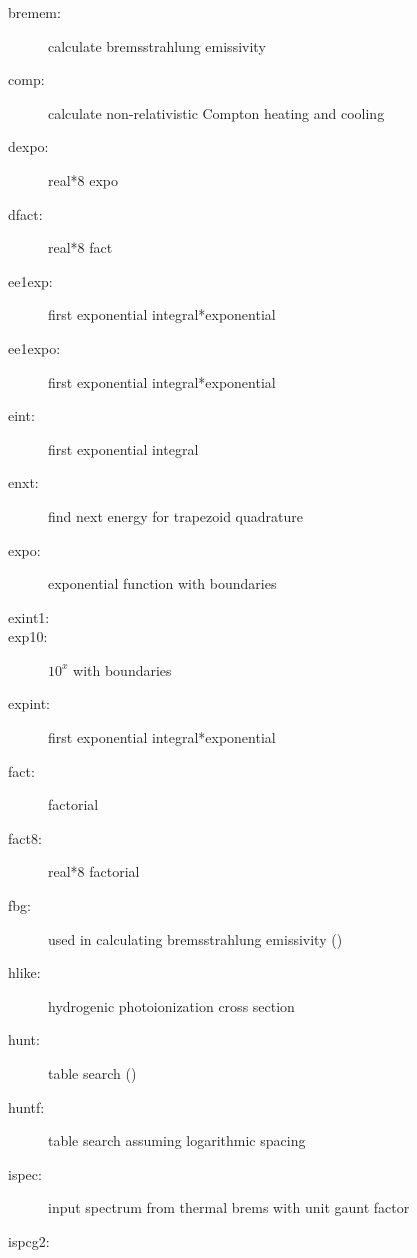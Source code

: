 \begin{description}

\item[bremem:]calculate bremsstrahlung emissivity


\item[comp:]calculate non-relativistic Compton heating and cooling

\item[dexpo:] real*8 expo

\item[dfact:] real*8 fact

\item[ee1exp:]first exponential integral*exponential

\item[ee1expo:]first exponential integral*exponential

\item[eint:]first exponential integral

\item[enxt:] find next energy for trapezoid quadrature

\item[expo:]exponential function with boundaries

\item[exint1:]

\item[exp10:] $10^x$ with boundaries

\item[expint:]first exponential integral*exponential

\item[fact:] factorial

\item[fact8:] real*8 factorial

\item[fbg:]used in calculating bremsstrahlung emissivity (\cite{Raymond1976})

\item[hlike:]hydrogenic photoionization cross section

\item[hunt:]table search (\cite{Press})

\item[huntf:]table search assuming logarithmic spacing

\item[ispec:]input spectrum from thermal brems with unit gaunt factor

\item[ispcg2:]


\end{description}
